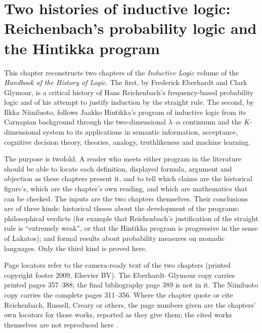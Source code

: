 \chapter{Two histories of inductive logic: Reichenbach's probability logic and the Hintikka program}
\label{sec:p15-w02b-p15-030}

This chapter reconstructs two chapters of the \emph{Inductive Logic}
volume of the \emph{Handbook of the History of Logic}. The first, by
Frederick Eberhardt and Clark Glymour, is a critical history of Hans
Reichenbach's frequency-based probability logic and of his attempt to
justify induction by the straight rule. The second, by Ilkka Niiniluoto,
follows Jaakko Hintikka's program of inductive logic from its Carnapian
background through the two-dimensional \(\lambda\)--\(\alpha\)
continuum and the \(K\)-dimensional system to its applications in
semantic information, acceptance, cognitive decision theory, theories,
analogy, truthlikeness and machine learning.

The purpose is twofold. A reader who meets either program in the
literature should be able to locate each definition, displayed formula,
argument and objection as these chapters present it, and to tell which
claims are the historical figure's, which are the chapter's own
reading, and which are mathematics that can be checked. The inputs are
the two chapters themselves. Their conclusions are of three kinds:
historical theses about the development of the programs; philosophical
verdicts (for example that Reichenbach's justification of the straight
rule is ``extremely weak'', or that the Hintikka program is progressive
in the sense of Lakatos); and formal results about probability
measures on monadic languages. Only the third kind is proved here.

Page locators refer to the camera-ready text of the two chapters
(printed copyright footer 2009, Elsevier BV). The Eberhardt--Glymour
copy carries printed pages 357--388; the final bibliography page 389 is
not in it. The Niiniluoto copy carries the complete pages 311--356.
Where the chapter quote or cite Reichenbach, Russell, Creary or
others, the page numbers given are the chapters' own locators for
those works, reported as they give them; the cited works themselves are
not reproduced here
\cite{EberhardtGlymour2011ReichenbachReading,Niiniluoto2011HintikkaProgramReading}.

